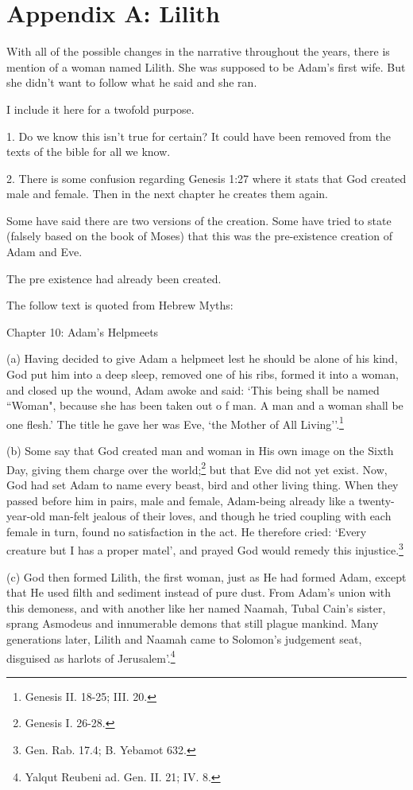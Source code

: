 \documentclass{article}
\begin{document}
\newpage

\section{Appendix A: Lilith}

With all of the possible changes in the narrative throughout the years, there is
mention of a woman named Lilith. She was supposed to be Adam's first wife. But
she didn't want to follow what he said and she ran.

I include it here for a twofold purpose.

1. Do we know this isn't true for certain? It could have been removed from the
texts of the bible for all we know.

2. There is some confusion regarding Genesis 1:27 where it stats that God
created male and female. Then in the next chapter he creates them again.

Some have said there are two versions of the creation. Some have tried to state
(falsely based on the book of Moses) that this was the pre-existence creation of
Adam and Eve.

The pre existence had already been created.

The follow text is quoted from Hebrew Myths\cite{myth}:

Chapter 10: Adam's Helpmeets

(a) Having decided to give Adam a helpmeet lest he should be alone
of his kind, God put him into a deep sleep, removed one of his
ribs, formed it into a woman, and closed up the wound, Adam awoke
and said: `This being shall be named ``Woman", because she has been
taken out o f man. A man and a woman shall be one flesh.' The
title he gave her was Eve, `the Mother of 
All Living''.\footnote{Genesis II. 18-25; III. 20.}

(b) Some say that God created man and woman in His own image on
the Sixth Day, giving them charge over the 
world;\footnote{Genesis I. 26-28.} but that Eve
did not yet exist. Now, God had set Adam to name every beast, bird
and other living thing. When they passed before him in pairs, male
and female, Adam-being already like a twenty-year-old man-felt
jealous of their loves, and though he tried coupling with each
female in turn, found no satisfaction in the act. He therefore
cried: `Every creature but I has a proper matel', and prayed God
would remedy this injustice.\footnote{Gen. Rab. 17.4; B. Yebamot 632.}

(c) God then formed Lilith, the first woman, just as He had
formed Adam, except that He used filth and sediment instead of
pure dust. From Adam's union with this demoness, and with another
like her named Naamah, Tubal Cain's sister, sprang Asmodeus and
innumerable demons that still plague mankind. Many generations
later, Lilith and Naamah came to Solomon's judgement seat,
disguised as harlots of 
Jerusalem'.\footnote{Yalqut Reubeni ad. Gen. II. 21; IV. 8.}
\end{document}
